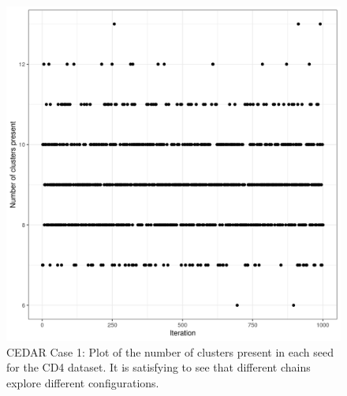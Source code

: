 \documentclass[12pt]{article} %
\begin{document}
	\begin{figure}[h]
		\centering
		\includegraphics[scale=0.75]{Images/Biology_data/Set_250/All_datasets/Cluster_series_plots/CD4.png}
		\caption{CEDAR Case 1: Plot of the number of clusters present in each seed for the CD4 dataset. It is satisfying to see that different chains explore different configurations.}
		\label{fig:results:cedar_1:mdi_cd4_number_clusters_plot}
	\end{figure}
	
	\newpage
	
\end{document}

